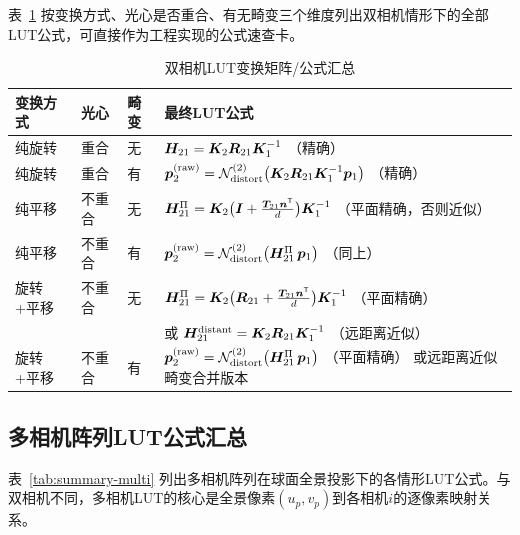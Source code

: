 表~\ref{tab:summary-dual} 按变换方式、光心是否重合、有无畸变三个维度列出双相机情形下的全部LUT公式，可直接作为工程实现的公式速查卡。

\begin{table}[H]
\centering
\caption{双相机LUT变换矩阵/公式汇总}
\label{tab:summary-dual}
\small
\begin{tabularx}{\textwidth}{p{2.0cm}p{2.8cm}p{2.0cm}X}
\toprule
\textbf{变换方式} & \textbf{光心} & \textbf{畸变} & \textbf{最终LUT公式} \\
\midrule
纯旋转
  & 重合
  & 无
  & $\bm{H}_{21} = \bm{K}_2\bm{R}_{21}\bm{K}_1^{-1}$ \quad（精确）\\[4pt]

纯旋转
  & 重合
  & 有
  & $\bm{p}_2^{\text{(raw)}} = \mathcal{N}_{\text{distort}}^{(2)}\bigl(\bm{K}_2\bm{R}_{21}\bm{K}_1^{-1}\bm{p}_1\bigr)$ \quad（精确）\\[4pt]

纯平移
  & 不重合
  & 无
  & $\bm{H}_{21}^{\Pi} = \bm{K}_2\bigl(\bm{I} + \frac{\bm{T}_{21}\bm{n}^{\mathsf{T}}}{d}\bigr)\bm{K}_1^{-1}$ \quad（平面精确，否则近似）\\[4pt]

纯平移
  & 不重合
  & 有
  & $\bm{p}_2^{\text{(raw)}} = \mathcal{N}_{\text{distort}}^{(2)}\bigl(\bm{H}_{21}^{\Pi}\,\bm{p}_1\bigr)$ \quad（同上）\\[4pt]

旋转+平移
  & 不重合
  & 无
  & $\bm{H}_{21}^{\Pi} = \bm{K}_2\bigl(\bm{R}_{21} + \frac{\bm{T}_{21}\bm{n}^{\mathsf{T}}}{d}\bigr)\bm{K}_1^{-1}$ \quad（平面精确）\\[4pt]
  & & & 或 $\bm{H}_{21}^{\text{distant}} = \bm{K}_2\bm{R}_{21}\bm{K}_1^{-1}$ \quad（远距离近似）\\[4pt]

旋转+平移
  & 不重合
  & 有
  & $\bm{p}_2^{\text{(raw)}} = \mathcal{N}_{\text{distort}}^{(2)}\bigl(\bm{H}_{21}^{\Pi}\,\bm{p}_1\bigr)$ \quad（平面精确）
  或远距离近似畸变合并版本 \\
\bottomrule
\end{tabularx}
\end{table}

\subsection{多相机阵列LUT公式汇总}
\label{sec:summary-multi}

表~\ref{tab:summary-multi} 列出多相机阵列在球面全景投影下的各情形LUT公式。与双相机不同，多相机LUT的核心是全景像素$(u_p,v_p)$到各相机$i$的逐像素映射关系。

